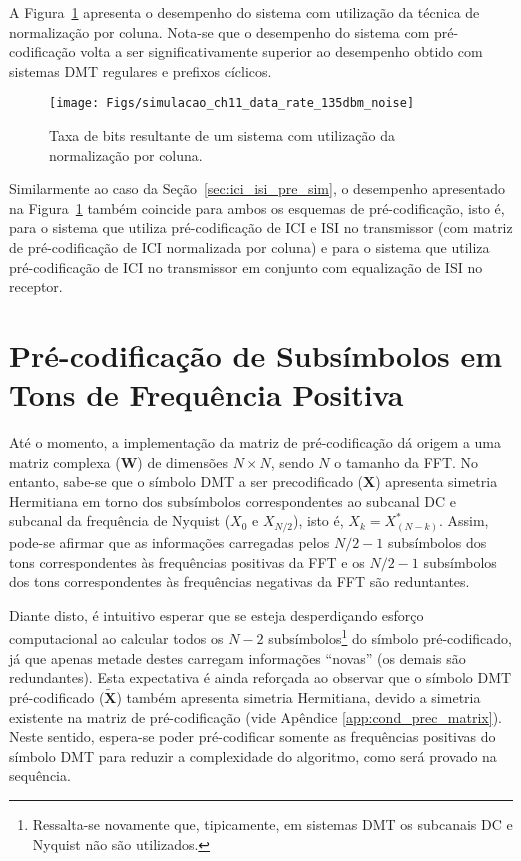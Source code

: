 A Figura~\ref{fig:simulacao_ch11_data_rate_135dbm_noise} apresenta o desempenho do sistema com utilização da técnica de normalização por coluna. Nota-se que o desempenho do sistema com pré-codificação volta a ser significativamente superior ao desempenho obtido com sistemas DMT regulares e prefixos cíclicos.

\begin{figure}[htbp]
\centering
\texttt{[image: Figs/simulacao\_ch11\_data\_rate\_135dbm\_noise]}
\caption{ Taxa de bits resultante de um sistema com utilização da normalização por coluna. \label{fig:simulacao_ch11_data_rate_135dbm_noise}}
\end{figure}

Similarmente ao caso da Seção~\ref{sec:ici_isi_pre_sim}, o desempenho apresentado na Figura~\ref{fig:simulacao_ch11_data_rate_135dbm_noise} também coincide para ambos os esquemas de pré-codificação, isto é, para o sistema que utiliza pré-codificação de ICI e ISI no transmissor (com matriz de pré-codificação de ICI normalizada por coluna) e para o sistema que utiliza pré-codificação de ICI no transmissor em conjunto com equalização de ISI no receptor.


\section{Pré-codificação de Subsímbolos em Tons de Frequência Positiva} 
\label{sec:hermitian_precoder}

Até o momento, a implementação da matriz de pré-codificação dá origem a uma matriz complexa ($\mathbf{W}$) de dimensões $N \times N$, sendo $N$ o tamanho da FFT. No entanto, sabe-se que o símbolo DMT a ser precodificado ($\mathbf{X}$) apresenta simetria Hermitiana em torno dos subsímbolos correspondentes ao subcanal DC e subcanal da frequência de Nyquist ($X_0$ e $X_{N/2}$), isto é, $X_k = X_{(N-k)}^{*}$. Assim, pode-se afirmar que as informações carregadas pelos $N/2 -1$ subsímbolos dos tons correspondentes às frequências positivas da FFT e os $N/2 -1$ subsímbolos dos tons correspondentes às frequências negativas da FFT são reduntantes.

Diante disto, é intuitivo esperar que se esteja desperdiçando esforço computacional ao calcular todos os $N-2$ subsímbolos\footnote{Ressalta-se novamente que, tipicamente, em sistemas DMT os subcanais DC e Nyquist não são utilizados.} do símbolo pré-codificado, já que apenas metade destes carregam informações ``novas'' (os demais são redundantes). Esta expectativa é ainda reforçada ao observar que o símbolo DMT pré-codificado ($\tilde{\mathbf{X}}$) também apresenta simetria Hermitiana, devido a simetria existente na matriz de pré-codificação (vide Apêndice \ref{app:cond_prec_matrix}). Neste sentido, espera-se poder pré-codificar somente as frequências positivas do símbolo DMT para reduzir a complexidade do algoritmo, como será provado na sequência.

